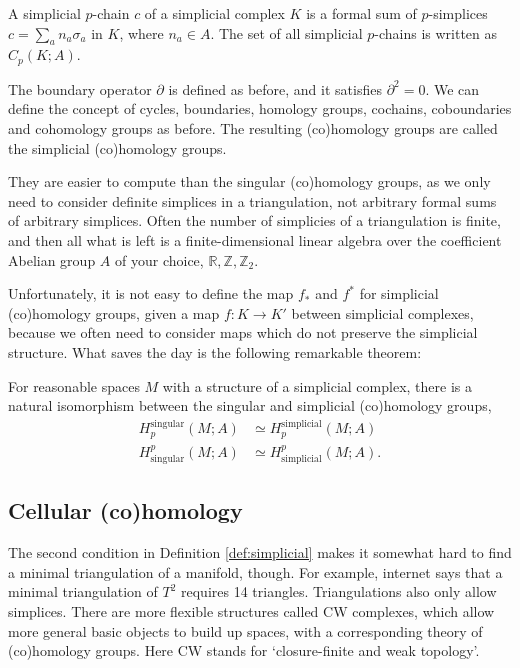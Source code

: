 \documentclass[12pt]{article}
\numberwithin{equation}{section}
\numberwithin{figure}{section}
\theoremstyle{remark}
\def\bR{\mathbb{R}}
\def\bZ{\mathbb{Z}}
\begin{document}
\begin{definition}
  A simplicial $p$-chain $c$ of a simplicial complex $K$ is a formal sum of $p$-simplices $c=\sum_a n_a \sigma_a$ in $K$, where $n_a\in A$.
  The set of all simplicial $p$-chains is written as $C_p(K;A)$.
\end{definition}

The boundary operator $\partial$ is defined as before, and it satisfies $\partial^2=0$.
We can define the concept of cycles, boundaries, homology groups, cochains, coboundaries and cohomology groups as before.
The resulting (co)homology groups are called the simplicial (co)homology groups.

They are easier to compute than the singular (co)homology groups, 
as we only need to consider definite simplices in a triangulation,
not arbitrary formal sums of arbitrary simplices.
Often the number of simplicies of a triangulation is finite, and 
then all what is left is a finite-dimensional linear algebra over 
the coefficient Abelian group $A$ of your choice, $\bR, \bZ, \bZ_2$.

Unfortunately, it is not easy to define the map $f_*$ and $f^*$ 
for simplicial (co)homology groups, given a map $f:K\to K'$ 
between simplicial complexes,
because we often need to consider maps which do not preserve the simplicial structure.
What saves the day is the following remarkable theorem:
\begin{theorem}
For reasonable spaces $M$ with a structure of a simplicial complex,
there is a natural isomorphism between the singular and simplicial (co)homology groups, 
\begin{align}
  H_p^\text{singular}(M;A)&\simeq H_p^\text{simplicial}(M;A)\\
  H^p_\text{singular}(M;A)&\simeq H^p_\text{simplicial}(M;A).
\end{align}

\end{theorem}


\subsection{Cellular (co)homology}

The second condition in Definition \ref{def:simplicial} makes it somewhat hard to find a minimal triangulation of a manifold, though. 
For example, internet says that a minimal triangulation of $T^2$ requires 14 triangles.
Triangulations also only allow simplices. 
There are more flexible structures called CW complexes, which allow more general basic objects to build up spaces,
with a corresponding theory of (co)homology groups.
Here CW stands for `closure-finite and weak topology'.
\end{document}
